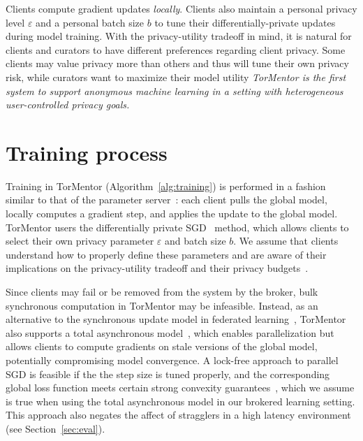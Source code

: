 Clients compute gradient updates \emph{locally}. Clients also
maintain a personal privacy level $\varepsilon$ and a personal batch
size $b$ to tune their differentially-private updates during model
training. With the privacy-utility tradeoff in mind, it is natural for
clients and curators to have different preferences regarding client
privacy. Some clients may value privacy more than others and thus will
tune their own privacy risk, while curators want to maximize their
model utility \emph{TorMentor is the first system to support anonymous
machine learning in a setting with heterogeneous user-controlled
privacy goals.}

\section{Training process}
\label{sec:training}

Training in TorMentor (Algorithm~\ref{alg:training}) is performed in a
fashion similar to that of the parameter server~\cite{Li:2014}:
each client pulls the global model, locally computes a gradient step,
and applies the update to the global model. TorMentor users the
differentially private SGD~\cite{Song:2013} method, which allows
clients to select their own privacy parameter $\varepsilon$ and batch
size $b$. We assume that clients understand how to properly define
these parameters and are aware of their implications on the
privacy-utility tradeoff and their privacy budgets~\cite{Dwork:2014}.

Since clients may fail or be removed from the system by the broker,
bulk synchronous computation in TorMentor may be infeasible. Instead,
as an alternative to the synchronous update model in federated
learning~\cite{McMahan:2017}, TorMentor also supports a total
asynchronous model~\cite{Hsieh:2017, Li:2014}, which enables
parallelization but allows clients to compute gradients on stale
versions of the global model, potentially compromising model
convergence. A lock-free approach to parallel SGD is feasible if
the the step size is tuned properly, and the corresponding global loss
function meets certain strong convexity guarantees~\cite{Recht:2011},
which we assume is true when using the total asynchronous model
in our brokered learning setting. This approach also negates the affect
of stragglers in a high latency environment (see 
Section~\ref{sec:eval}).


